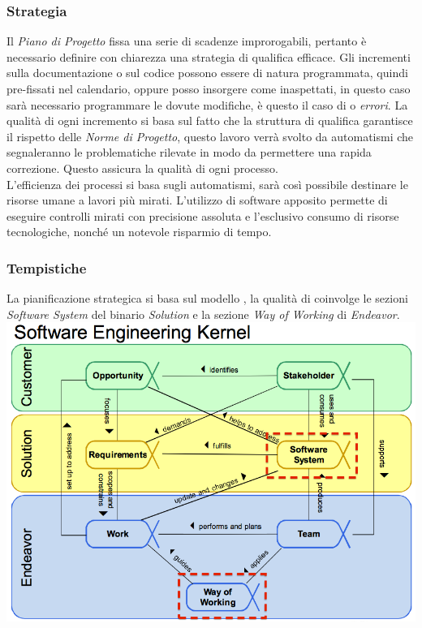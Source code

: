 		\subsubsection{Strategia}
		Il \emph{Piano di Progetto} fissa una serie di scadenze improrogabili, pertanto è necessario definire con chiarezza una strategia di qualifica efficace. Gli incrementi sulla documentazione o sul codice possono essere di natura programmata, quindi pre-fissati nel calendario, oppure posso insorgere come inaspettati, in questo caso sarà necessario programmare le dovute modifiche, è questo il caso di  o \emph{errori}. La qualità di ogni incremento si basa sul fatto che la struttura di qualifica garantisce il rispetto delle \emph{Norme di Progetto}, questo lavoro verrà svolto da automatismi che segnaleranno le problematiche rilevate in modo da permettere una rapida correzione. Questo assicura la qualità di ogni processo. \\
	L'efficienza dei processi si basa sugli automatismi, sarà così possibile destinare le risorse umane a lavori più mirati. L'utilizzo di software apposito permette di eseguire controlli mirati con precisione assoluta e l'esclusivo consumo di risorse tecnologiche, nonché un notevole risparmio di tempo.\\
	
		\subsubsection{Tempistiche}
		La pianificazione strategica si basa sul modello , la qualità di  coinvolge le sezioni \emph{Software System} del binario \emph{Solution} e la sezione \emph{Way of Working} di  \emph{Endeavor}. \\
		
   { \centering \includegraphics[width=1\textwidth]{Semat.png} \\}
   
